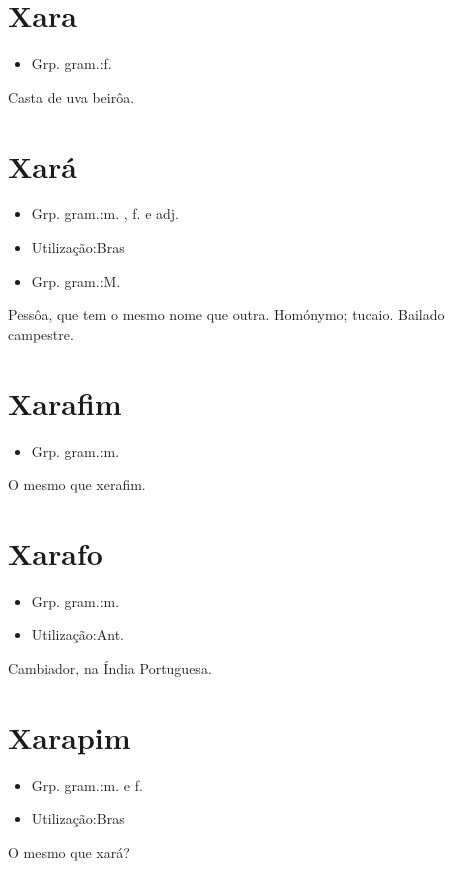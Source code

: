 \section{Xara}
\begin{itemize}
\item {Grp. gram.:f.}
\end{itemize}
Casta de uva beirôa.
\section{Xará}
\begin{itemize}
\item {Grp. gram.:m. ,  f.  e  adj.}
\end{itemize}
\begin{itemize}
\item {Utilização:Bras}
\end{itemize}
\begin{itemize}
\item {Grp. gram.:M.}
\end{itemize}
Pessôa, que tem o mesmo nome que outra.
Homónymo; tucaio.
Bailado campestre.
\section{Xarafim}
\begin{itemize}
\item {Grp. gram.:m.}
\end{itemize}
O mesmo que \textunderscore xerafim\textunderscore .
\section{Xarafo}
\begin{itemize}
\item {Grp. gram.:m.}
\end{itemize}
\begin{itemize}
\item {Utilização:Ant.}
\end{itemize}
Cambiador, na Índia Portuguesa.
\section{Xarapim}
\begin{itemize}
\item {Grp. gram.:m.  e  f.}
\end{itemize}
\begin{itemize}
\item {Utilização:Bras}
\end{itemize}
O mesmo que \textunderscore xará\textunderscore ?
